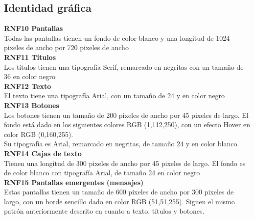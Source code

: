 \subsection{Identidad gráfica}

\textbf{RNF10 \hspace{2cm}Pantallas}\\
Todas las pantallas tienen un fondo de color blanco y una longitud de 1024 pixeles de ancho por 720 pixeles de ancho\\

\textbf{RNF11 \hspace{2cm}Títulos}\\
Los títulos tienen una tipografía Serif, remarcado en negritas con un tamaño de 36 en color negro\\

\textbf{RNF12 \hspace{2cm}Texto}\\
El texto tiene una tipografía Arial, con un tamaño de 24 y en color negro\\

\textbf{RNF13 \hspace{2cm}Botones}\\
Los botones tienen un tamaño de 200 pixeles de ancho por 45 pixeles de largo.
El fondo está dado en los siguientes colores RGB (1,112,250), con un efecto Hover en color RGB (0,160,255).\\
Su tipografía es Arial, remarcado en negritas, de tamaño 24 y en color blanco.\\

\textbf{RNF14 \hspace{2cm}Cajas de texto}\\
Tienen una longitud de 300 pixeles de ancho por 45 pixeles de largo.
El fondo es de color blanco con tipografía Arial, de tamaño 24 en color negro\\

\textbf{RNF15 \hspace{2cm}Pantallas emergentes (mensajes)}\\
Estas pantallas tienen un tamaño de 600 pixeles de ancho por 300 pixeles de largo, con un borde sencillo dado en color RGB (51,51,255). Siguen el mismo patrón anteriormente descrito en cuanto a texto, títulos y botones.\\





